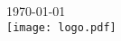 \begin{center}

{\Large \today}\\[1.5cm] %


\texttt{[image: logo.pdf]} %
 

\vfill %
\end{center}
\restoregeometry





